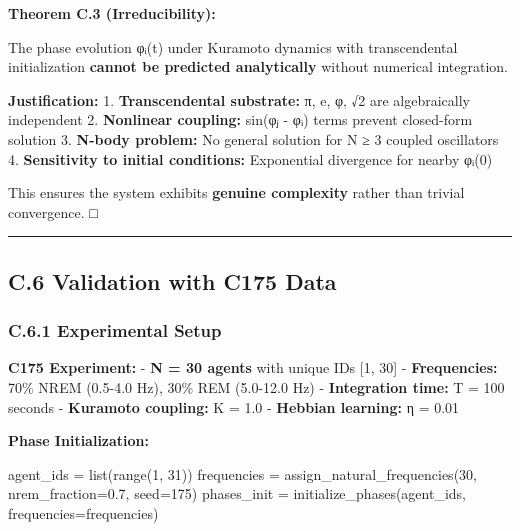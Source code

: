 \documentclass[
]{article}
\newenvironment{Shaded}{}{}
\newcommand{\BuiltInTok}[1]{\textcolor[rgb]{0.00,0.50,0.00}{#1}}
\newcommand{\DecValTok}[1]{\textcolor[rgb]{0.25,0.63,0.44}{#1}}
\newcommand{\FloatTok}[1]{\textcolor[rgb]{0.25,0.63,0.44}{#1}}
\newcommand{\NormalTok}[1]{#1}
\newcommand{\OperatorTok}[1]{\textcolor[rgb]{0.40,0.40,0.40}{#1}}
\begin{document}
\textbf{Theorem C.3 (Irreducibility):}

The phase evolution φᵢ(t) under Kuramoto dynamics with transcendental
initialization \textbf{cannot be predicted analytically} without
numerical integration.

\textbf{Justification:} 1. \textbf{Transcendental substrate:} π, e, φ,
√2 are algebraically independent 2. \textbf{Nonlinear coupling:} sin(φⱼ
- φᵢ) terms prevent closed-form solution 3. \textbf{N-body problem:} No
general solution for N ≥ 3 coupled oscillators 4. \textbf{Sensitivity to
initial conditions:} Exponential divergence for nearby φᵢ(0)

This ensures the system exhibits \textbf{genuine complexity} rather than
trivial convergence. □

\begin{center}\rule{0.5\linewidth}{0.5pt}\end{center}

\subsection{C.6 Validation with C175
Data}\label{c.6-validation-with-c175-data}

\subsubsection{C.6.1 Experimental Setup}\label{c.6.1-experimental-setup}

\textbf{C175 Experiment:} - \textbf{N = 30 agents} with unique IDs {[}1,
30{]} - \textbf{Frequencies:} 70\% NREM (0.5-4.0 Hz), 30\% REM (5.0-12.0
Hz) - \textbf{Integration time:} T = 100 seconds - \textbf{Kuramoto
coupling:} K = 1.0 - \textbf{Hebbian learning:} η = 0.01

\textbf{Phase Initialization:}

\begin{Shaded}
\begin{Highlighting}[]
\NormalTok{agent\_ids }\OperatorTok{=} \BuiltInTok{list}\NormalTok{(}\BuiltInTok{range}\NormalTok{(}\DecValTok{1}\NormalTok{, }\DecValTok{31}\NormalTok{))}
\NormalTok{frequencies }\OperatorTok{=}\NormalTok{ assign\_natural\_frequencies(}\DecValTok{30}\NormalTok{, nrem\_fraction}\OperatorTok{=}\FloatTok{0.7}\NormalTok{, seed}\OperatorTok{=}\DecValTok{175}\NormalTok{)}
\NormalTok{phases\_init }\OperatorTok{=}\NormalTok{ initialize\_phases(agent\_ids, frequencies}\OperatorTok{=}\NormalTok{frequencies)}
\end{Highlighting}
\end{Shaded}
\end{document}
